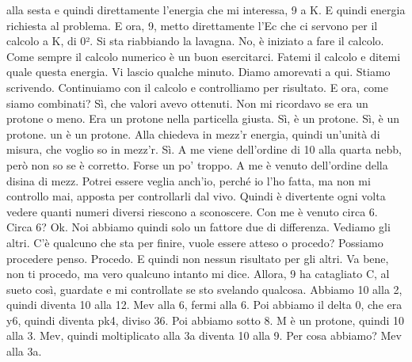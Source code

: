 {\begin{soluzione}
   alla sesta e quindi direttamente l'energia che mi interessa, 9 a K. E quindi energia richiesta al problema. E ora, 9, metto direttamente l'Ec che ci servono per il calcolo a K, di 0². Si sta riabbiando la lavagna. No, è iniziato a fare il calcolo. Come sempre il calcolo numerico è un buon esercitarci. Fatemi il calcolo e ditemi quale questa energia. Vi lascio qualche minuto. Diamo amorevati a qui. Stiamo scrivendo. Continuiamo con il calcolo e controlliamo per risultato. E ora, come siamo combinati? Sì, che valori avevo ottenuti. Non mi ricordavo se era un protone o meno. Era un protone nella particella giusta. Sì, è un protone. Sì, è un protone. un è un protone. Alla chiedeva in mezz'r energia, quindi un'unità di misura, che voglio so in mezz'r. Sì. A me viene dell'ordine di 10 alla quarta nebb, però non so se è corretto. Forse un po' troppo. A me è venuto dell'ordine della disina di mezz. Potrei essere veglia anch'io, perché io l'ho fatta, ma non mi controllo mai, apposta per controllarli dal vivo. Quindi è divertente ogni volta vedere quanti numeri diversi riescono a sconoscere. Con me è venuto circa 6. Circa 6? Ok. Noi abbiamo quindi solo un fattore due di differenza. Vediamo gli altri. C'è qualcuno che sta per finire, vuole essere atteso o procedo? Possiamo procedere penso. Procedo. E quindi non nessun risultato per gli altri. Va bene, non ti procedo, ma vero qualcuno intanto mi dice. Allora, 9 ha catagliato C, al sueto così, guardate e mi controllate se sto svelando qualcosa. Abbiamo 10 alla 2, quindi diventa 10 alla 12. Mev alla 6, fermi alla 6. Poi abbiamo il delta 0, che era y6, quindi diventa pk4, diviso 36. Poi abbiamo sotto 8. M è un protone, quindi 10 alla 3. Mev, quindi moltiplicato alla 3a diventa 10 alla 9. Per cosa abbiamo? Mev alla 3a. 
   

\end{soluzione}}
